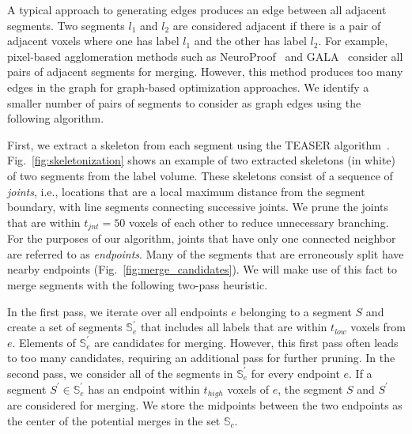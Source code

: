 A typical approach to generating edges produces an edge between all adjacent segments. Two segments $l_1$ and $l_2$ are considered adjacent if there is a pair of adjacent voxels where one has label $l_1$ and the other has label $l_2$.
For example, pixel-based agglomeration methods such as NeuroProof~\cite{} and GALA~\cite{}  consider all pairs of adjacent segments for merging.
However, this method produces too many edges in the graph for graph-based optimization approaches. We identify a smaller number of pairs of segments to consider as graph edges using the following algorithm.

First, we extract a skeleton from each segment using the TEASER algorithm~\cite{sato2000teasar,zhao2014automatic}. Fig.~\ref{fig:skeletonization} shows an example of two extracted skeletons (in white) of two segments from the label volume. These skeletons consist of a sequence of \textit{joints}, i.e., locations that are a local maximum distance from the segment boundary, with line segments connecting successive joints. We prune the joints that are within $t_{jnt} = 50$ voxels of each other to reduce unnecessary branching. For the purposes of our algorithm, joints that have only one connected neighbor are referred to as \textit{endpoints}. Many of the segments that are erroneously split have nearby endpoints  (Fig.~\ref{fig:merge_candidates}). We will make use of this fact to merge segments with the following two-pass heuristic.

In the first pass, we iterate over all endpoints $e$ belonging to a segment $S$ and create a set of segments $\mathbb{S}_e^\prime$ that includes all labels that are within $t_{low}$ voxels from $e$. Elements of $\mathbb{S}_e^\prime$ are candidates for merging. However, this first pass often leads to too many candidates, requiring an additional pass for further pruning. In the second pass, we consider all of the segments in $\mathbb{S}_e^\prime$ for every endpoint $e$. If a segment $S^\prime \in \mathbb{S}_e^\prime$ has an endpoint within $t_{high}$ voxels of $e$, the segment $S$ and $S^\prime$ are considered for merging. We store the midpoints between the two endpoints as the center of the potential merges in the set $\mathbb{S}_c$.

